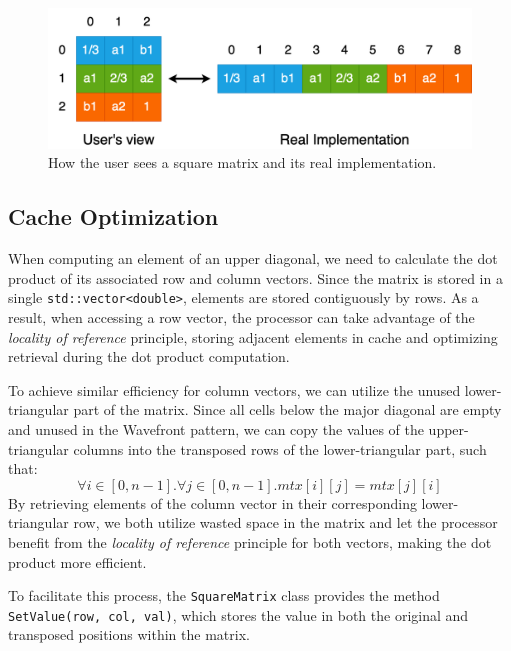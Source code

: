 \begin{figure}[h]
    \centering\includegraphics[scale=0.30]{img/Sequential Implementation/SquareMatriximpl.drawio.png}
    
    \caption{How the user sees a square matrix and its real implementation.}
\end{figure}

\subsection*{Cache Optimization}
When computing an element of an upper diagonal, we need to calculate the dot product of its associated row and column vectors. Since the matrix is stored in a single \texttt{std::vector<double>}, elements are stored contiguously by rows. As a result, when accessing a row vector, the processor can take advantage of the \textit{locality of reference} principle, storing adjacent elements in cache and optimizing retrieval during the dot product computation.
\par To achieve similar efficiency for column vectors, we can utilize the unused lower-triangular part of the matrix. Since all cells below the major diagonal are empty and unused in the Wavefront pattern, we can copy the values of the upper-triangular columns into the transposed rows of the lower-triangular part, such that:
\begin{equation}
    \forall i \in [0, n - 1]. \forall j \in [0, n - 1]. mtx[i][j] = mtx[j][i]
\end{equation}
By retrieving elements of the column vector in their corresponding lower-triangular row, we both utilize wasted space in the matrix and let the processor benefit from the \textit{locality of reference} principle for both vectors, making the dot product more efficient.

\par To facilitate this process, the \texttt{SquareMatrix} class provides the method \texttt{SetValue(row, col, val)}, which stores the value in both the original and transposed positions within the matrix.


